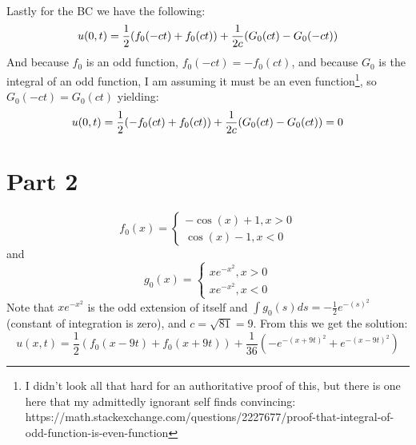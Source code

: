 \documentclass{article}
\begin{document}
\\
Lastly for the BC we have the following:
\begin{equation}
u(0, t) = \frac{1}{2}(f_0(-ct) + f_0(ct)) + \frac{1}{2c}(G_0(ct) - G_0(-ct))\\
\end{equation}
And because $f_0$ is an odd function, $f_0(-ct) = -f_0(ct)$, and because $G_0$ is the integral of an odd function, I am assuming it must be an even function\footnote{I didn't look all that hard for an authoritative proof of this, but there is one here that my admittedly ignorant self finds convincing: https://math.stackexchange.com/questions/2227677/proof-that-integral-of-odd-function-is-even-function}, so $G_0(-ct) = G_0(ct)$ yielding:
\begin{equation}
u(0, t) = \frac{1}{2}(-f_0(ct) + f_0(ct)) + \frac{1}{2c}(G_0(ct) - G_0(ct))= 0\\
\end{equation}
\section*{Part 2}
\[f_0(x) =
  \begin{cases}
               -\cos (x) + 1 , x > 0\\
               \cos(x) - 1, x < 0
            \end{cases}
\]
and
\[g_0(x) =
  \begin{cases}
               xe^{-x^2} , x > 0\\
               xe^{-x^2}, x < 0
            \end{cases}
\]
Note that $xe^{-x^2}$ is the odd extension of itself and $\int g_0(s)ds = -\frac{1}{2}e^{-(s)^2}$ (constant of integration is zero), and $c = \sqrt{81} = 9$. From this we get the solution:
\begin{equation}
u(x,t) = \frac{1}{2}(f_0(x - 9t) + f_0(x + 9t))  +\frac{1}{36}(-e^{-(x+9t)^2} + e^{-(x-9t)^2})
\end{equation}
\end{document}
